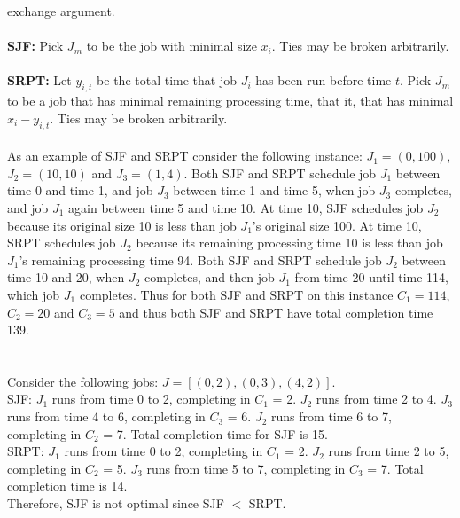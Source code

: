 \documentclass[10pt]{article}
\begin{document}
	exchange argument.\\
	\\
	\textbf{SJF:} Pick $J_{m}$ to be the job with minimal size $x_{i}$. Ties may be broken arbitrarily.\\
	\\
	\textbf{SRPT:} Let $y_{i,t}$ be the total time that job $J_{i}$ has been run before time $t$. Pick $J_{m}$ to be a job that has
	minimal remaining processing time, that it, that has minimal $x_{i} - y_{i,t}$. Ties may be broken arbitrarily.\\
	\\
	As an example of SJF and SRPT consider the following instance:  $J_{1} = (0, 100)$, $J_{2} = (10, 10)$ and
	$J_{3} = (1, 4)$. Both SJF and SRPT schedule job $J_{1}$ between time 0 and time 1, and job $J _{3}$ between time
	1 and time 5, when job $J_{3}$ completes, and job $J_{1}$ again between time 5 and time 10. At time 10, SJF
	schedules job $J_{2}$ because its original size 10 is less than job $J_{1}$'s original size 100.  At time 10, SRPT
	schedules job $J_{2}$ because its remaining processing time 10 is less than job $J_{1}$'s remaining processing
	time 94. Both SJF and SRPT schedule job $J_{2}$ between time 10 and 20, when $J_{2}$ completes, and then
	job $J_{1}$ from time 20 until time 114, which job $J_{1}$ completes.  Thus for both SJF and SRPT on this
	instance $C_{1} = 114$, $C_{2} = 20$ and $C_{3} = 5$ and thus both SJF and SRPT have total completion time 139.\\
	\\
	\\
	Consider the following jobs: $J = [(0,2), (0,3), (4,2)]$.\\
	SJF:
	$J_{1}$ runs from time 0 to 2, completing in $C_{1}$ = 2.
	$J_{2}$ runs from time 2 to 4.
	$J_{3}$ runs from time 4 to 6, completing in $C_{3}$ = 6.
	$J_{2}$ runs from time 6 to 7, completing in $C_{2}$ = 7.
	Total completion time for SJF is 15.\\
	SRPT:
	$J_{1}$ runs from time 0 to 2, completing in $C_{1}$ = 2.
	$J_{2}$ runs from time 2 to 5, completing in $C_{2}$ = 5.
	$J_{3}$ runs from time 5 to 7, completing in $C_{3}$ = 7.
	Total completion time is 14.\\
	Therefore, SJF is not optimal since SJF $<$ SRPT.\\
	
	
\end{document}
